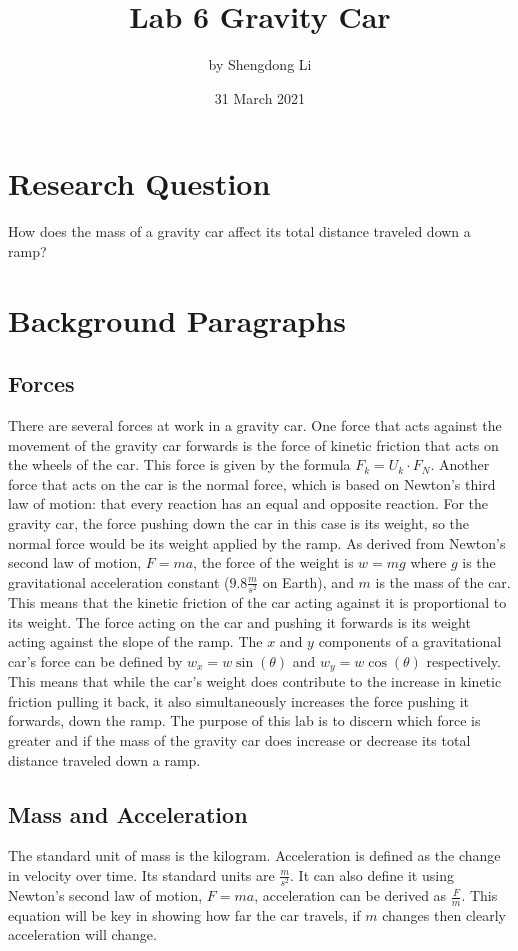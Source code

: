 \documentclass[12pt]{article}
\begin{document}
\title{Lab 6 Gravity Car}
\author{by Shengdong Li}
\date{31 March 2021}
\maketitle

\section{Research Question}

How does the mass of a gravity car affect its total distance traveled down a ramp?

\section{Background Paragraphs}

\subsection{Forces}
There are several forces at work in a gravity car. One force that acts against the movement of the gravity car forwards is the force of kinetic friction that acts on the wheels of the car. This force is given by the formula \(F_k=U_k\cdot F_N\). Another force that acts on the car is the normal force, which is based on Newton's third law of motion: that every reaction has an equal and opposite reaction. For the gravity car, the force pushing down the car in this case is its weight, so the normal force would be its weight applied by the ramp. As derived from Newton's second law of motion, \(F=ma\), the force of the weight is \(w=mg\) where \(g\) is the gravitational acceleration constant (\(9.8\frac{m}{s^2}\) on Earth), and \(m\) is the mass of the car. This means that the kinetic friction of the car acting against it is proportional to its weight. The force acting on the car and pushing it forwards is its weight acting against the slope of the ramp. The \(x\) and \(y\) components of a gravitational car's force can be defined by \(w_x=w\sin(\theta)\) and \(w_y=w\cos(\theta)\) respectively.
This means that while the car's weight does contribute to the increase in kinetic friction pulling it back, it also simultaneously increases the force pushing it forwards, down the ramp. The purpose of this lab is to discern which force is greater and if the mass of the gravity car does increase or decrease its total distance traveled down a ramp.

\subsection{Mass and Acceleration}
The standard unit of mass is the kilogram. Acceleration is defined as the change in velocity over time. Its standard units are \(\frac{m}{s^{2}}\). It can also define it using Newton's second law of motion, \(F=ma\), acceleration can be derived as \(\frac{F}{m}\). This equation will be key in showing how far the car travels, if \(m\) changes then clearly acceleration will change.
\end{document}
